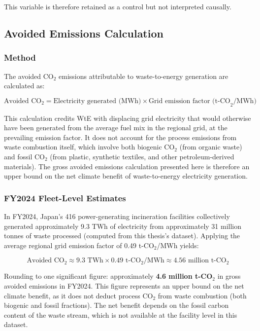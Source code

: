 \documentclass[12pt,a4paper]{article}
\begin{document}
This variable is therefore retained as a control but not interpreted causally.

\subsection{Avoided Emissions Calculation}

\subsubsection{Method}

The avoided CO$_2$ emissions attributable to waste-to-energy generation are calculated as:

\begin{equation}
\text{Avoided CO}_2 = \text{Electricity generated (MWh)} \times \text{Grid emission factor (t-CO}_2\text{/MWh)}
\end{equation}

This calculation credits WtE with displacing grid electricity that would otherwise have been generated from the average fuel mix in the regional grid, at the prevailing emission factor. It does not account for the process emissions from waste combustion itself, which involve both biogenic CO$_2$ (from organic waste) and fossil CO$_2$ (from plastic, synthetic textiles, and other petroleum-derived materials). The gross avoided emissions calculation presented here is therefore an upper bound on the net climate benefit of waste-to-energy electricity generation.

\subsubsection{FY2024 Fleet-Level Estimates}

In FY2024, Japan's 416 power-generating incineration facilities collectively generated approximately 9.3 TWh of electricity from approximately 31 million tonnes of waste processed (computed from this thesis's dataset). Applying the average regional grid emission factor of 0.49 t-CO$_2$/MWh yields:

\begin{equation}
\text{Avoided CO}_2 \approx 9.3 \text{ TWh} \times 0.49 \text{ t-CO}_2\text{/MWh} \approx 4.56 \text{ million t-CO}_2
\end{equation}

Rounding to one significant figure: approximately \textbf{4.6 million t-CO$_2$} in gross avoided emissions in FY2024. This figure represents an upper bound on the net climate benefit, as it does not deduct process CO$_2$ from waste combustion (both biogenic and fossil fractions). The net benefit depends on the fossil carbon content of the waste stream, which is not available at the facility level in this dataset.
\end{document}
